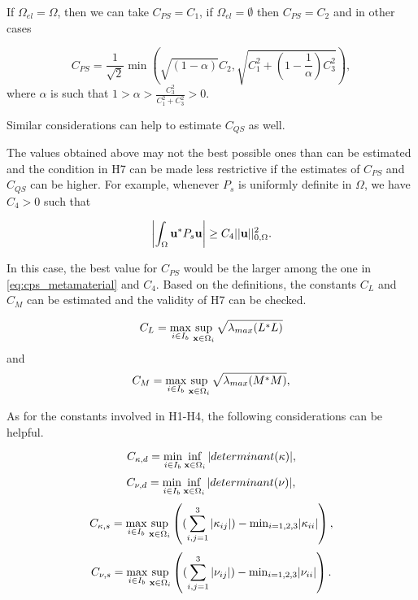 If $\Omega_{el}=\Omega$, then we can take $C_{PS} = C_1$, if 
$\Omega_{el} = \emptyset$ then $C_{PS} = C_2$ and in other cases

  \begin{equation} \label{eq:cps_metamaterial}
    C_{PS} = 
      \frac{1}{\sqrt{2}} 
      \min 
      \left( 
        \sqrt{(1-\alpha)} C_2, \sqrt{C_1^2+(1-\frac{1}{\alpha}) C_3^2}
      \right),
  \end{equation}
  where $\alpha$ is such that 
  $1 > \alpha > \frac{C_3^2}{C_1^2+C_3^2} > 0$.

Similar considerations can help to estimate $C_{QS}$ as well.

The values obtained above may not the best possible ones than can 
be estimated and the 
condition in H7 can be made less restrictive 
if the estimates of $C_{PS}$ and $C_{QS}$ can be higher.
For example, whenever $P_s$ is uniformly definite 
in $\Omega$, we have $C_4 >0$ such that

\begin{equation} \label{eq:c4_constant}
  \left| \int_{\Omega} {\bf u}^*P_s{\bf u} \right| 
  \geq 
  C_4||{\bf u}||^2_{0,\Omega}.
\end{equation}

In this case, the best value for $C_{PS}$ would be the 
larger among the one in \eqref{eq:cps_metamaterial} and $C_4$.
Based on the definitions, the constants $C_L$ and $C_M$ can
be  estimated and the validity of H7 can be checked.

\begin{equation} \label{equationnumber27}
  C_L = 
    \max_{i \in I_b} 
    \sup_{{\bf x} \in \Omega_i} \sqrt{\lambda_{max}(L^* L)} 
\end{equation}
%
and 
%
\begin{equation} \label{equationnumber28}
  C_M = 
    \max_{i \in I_b} 
    \sup_{{\bf x} \in \Omega_i} \sqrt{\lambda_{max}(M^* M)},
\end{equation}

As for the constants involved in H1-H4,  the following considerations
can be helpful.

\begin{equation} \label{equationnumber29}
  C_{\kappa, d} = 
    \min_{i \in I_b} \inf_{{\bf x} \in \Omega_i} 
    |determinant(\kappa)|,
\end{equation}
%
\begin{equation} \label{equationnumber30}
  C_{\nu, d} = 
    \min_{i \in I_b} \inf_{{\bf x} \in \Omega_i} 
    |determinant(\nu)|,
\end{equation}
%
\begin{equation} \label{equationnumber31}
  C_{\kappa,s} = 
    \max_{i \in I_b} \sup_{{\bf x} \in \Omega_i} 
      \left((\sum_{i,j=1}^3|\kappa_{ij}|)-\mathrm{min}_{i=1,2,3}|\kappa_{ii}| \right),
\end{equation}
%
\begin{equation} \label{equationnumber32}
  C_{\nu,s} = 
    \max_{i \in I_b} \sup_{{\bf x} \in \Omega_i} 
    \left((\sum_{i,j=1}^3|\nu_{ij}|)-\mathrm{min}_{i=1,2,3}|\nu_{ii}| \right).
\end{equation}
%

